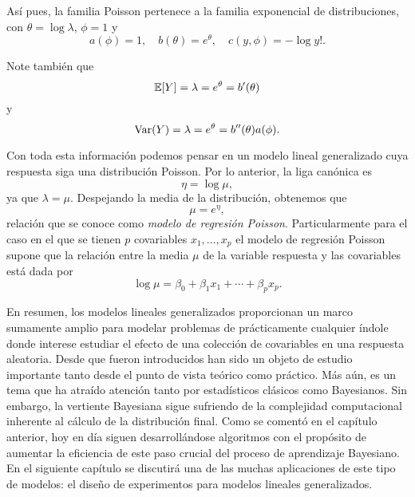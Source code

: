 Así pues, la familia Poisson pertenece a la familia exponencial de distribuciones, con $\theta = \log \lambda$, $\phi = 1$ y
\begin{equation*}
	a(\phi) = 1, \quad b(\theta) = e^{\theta}, \quad c(y, \phi) = -\log y!.
\end{equation*}

Note también que
\begin{equation*}
	\mathbb{E}[Y] = \lambda = e^{\theta} = b'(\theta)
\end{equation*}
y
\begin{equation*}
	\mathrm{Var}(Y) = \lambda = e^{\theta} = b''(\theta) a(\phi).
\end{equation*}

Con toda esta información podemos pensar en un modelo lineal generalizado cuya respuesta siga una distribución Poisson. Por lo anterior, la liga canónica es
\begin{equation*}
	\eta = \log \mu,
\end{equation*}
ya que $\lambda = \mu$. Despejando la media de la distribución, obtenemos que
\begin{equation} \label{eq:poisson_regression}
	\mu = e^\eta,
\end{equation}
relación que se conoce como \textit{modelo de regresión Poisson}. Particularmente para el caso en el que se tienen $p$ covariables $x_1, ..., x_p$ el modelo de regresión Poisson supone que la relación entre la media $\mu$ de la variable respuesta y las covariables está dada por
\begin{equation}
	\log \mu = \beta_0 + \beta_1 x_1 + \cdots + \beta_p x_p.
\end{equation}




\vskip 1cm



En resumen, los modelos lineales generalizados proporcionan un marco sumamente amplio para modelar problemas de prácticamente cualquier índole donde interese estudiar el efecto de una colección de covariables en una respuesta aleatoria. Desde que fueron introducidos han sido un objeto de estudio importante tanto desde el punto de vista teórico como práctico. Más aún, es un tema que ha atraído atención tanto por estadísticos clásicos como Bayesianos. Sin embargo, la vertiente Bayesiana sigue sufriendo de la complejidad computacional inherente al cálculo de la distribución final. Como se comentó en el capítulo anterior, hoy en día siguen desarrollándose algoritmos con el propósito de aumentar la eficiencia de este paso crucial del proceso de aprendizaje Bayesiano. En el siguiente capítulo se discutirá una de las muchas aplicaciones de este tipo de modelos: el diseño de experimentos para modelos lineales generalizados.


